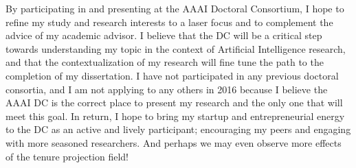 \documentclass[11pt,letterpaper]{article}
\begin{document}
By participating in and presenting at the AAAI Doctoral Consortium, I hope to refine my study and research interests to a laser focus and to complement the advice of my academic advisor. I believe that the DC will be a critical step towards understanding my topic in the context of Artificial Intelligence research, and that the contextualization of my research will fine tune the path to the completion of my dissertation. I have not participated in any previous doctoral consortia, and I am not applying to any others in 2016 because I believe the AAAI DC is the correct place to present my research and the only one that will meet this goal. In return, I hope to bring my startup and entrepreneurial energy to the DC as an active and lively participant; encouraging my peers and engaging with more seasoned researchers. And perhaps we may even observe more effects of the tenure projection field!

%
%
\end{document}
